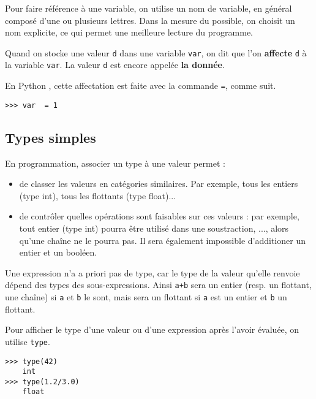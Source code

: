 Pour faire référence à une variable, on utilise un nom de variable, en général composé d'une ou 
plusieurs lettres. Dans la mesure du possible, on choisit un nom explicite, ce qui permet une 
meilleure lecture du programme.



\begin{defi}[Affectation]
Quand on stocke une valeur \texttt{d} dans une variable \texttt{var}, on dit que l'on 
\textbf{affecte} \texttt{d} à la variable \texttt{var}. La valeur
\texttt{d} est encore appelée \textbf{la donnée}.
\end{defi}

En Python , cette affectation est faite avec la commande \lstinline{=}, comme suit.  

\begin{lstlisting}
>>> var  = 1
\end{lstlisting}





\subsection{Types simples}

En programmation, associer un type à une valeur permet :
\begin{itemize}
\item de classer les valeurs en catégories similaires. Par exemple, tous les
entiers (type int), tous les flottants (type float)...
\item de contrôler quelles opérations sont faisables sur ces valeurs : par
exemple, tout entier (type int) pourra être utilisé dans une soustraction, ..., alors 
qu'une chaîne ne le pourra pas. Il sera également impossible d'additioner un entier et un booléen. 
                                     
\end{itemize}

Une expression n'a a priori pas de type, car le type de la valeur qu'elle renvoie dépend des types 
des sous-expressions. Ainsi \texttt{a+b} sera un entier (resp. un flottant, une chaîne) si 
\texttt{a} et \texttt{b} le sont, mais sera un flottant si \texttt{a} est un entier et \texttt{b} 
un flottant.


Pour afficher le type d'une valeur ou d'une expression après l'avoir évaluée, on utilise 
\texttt{type}. 
\begin{lstlisting}
>>> type(42)
	int
>>> type(1.2/3.0)
	float
\end{lstlisting}





